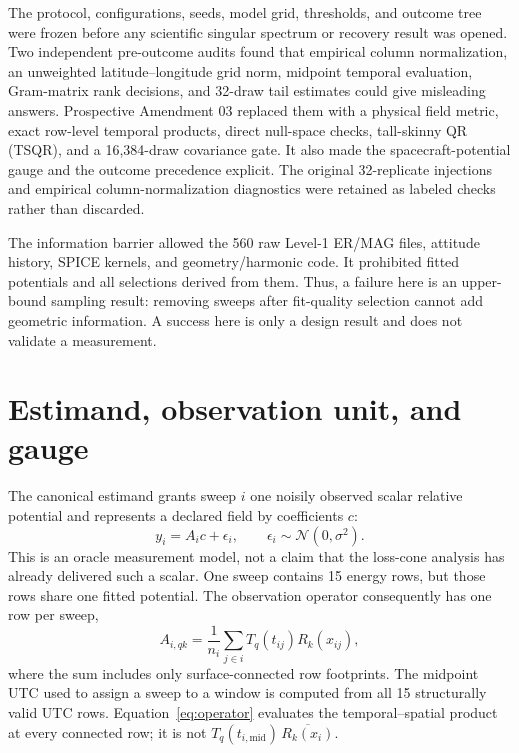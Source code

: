 \documentclass[11pt]{article}
\begin{document}
The protocol, configurations, seeds, model grid, thresholds, and outcome tree
were frozen before any scientific singular spectrum or recovery result was
opened.  Two independent pre-outcome audits found that empirical column
normalization, an unweighted latitude--longitude grid norm, midpoint temporal
evaluation, Gram-matrix rank decisions, and 32-draw tail estimates could give
misleading answers.  Prospective Amendment 03 replaced them with a physical
field metric, exact row-level temporal products, direct null-space checks,
tall-skinny QR (TSQR), and a 16,384-draw covariance gate.  It also made the
spacecraft-potential gauge and the outcome precedence explicit.  The original
32-replicate injections and empirical column-normalization diagnostics were
retained as labeled checks rather than discarded.

The information barrier allowed the 560 raw Level-1 ER/MAG files, attitude
history, SPICE kernels, and geometry/harmonic code.  It prohibited fitted
potentials and all selections derived from them.  Thus, a failure here is an
upper-bound sampling result: removing sweeps after fit-quality selection cannot
add geometric information.  A success here is only a design result and does
not validate a measurement.

\section{Estimand, observation unit, and gauge}

The canonical estimand grants sweep $i$ one noisily observed scalar relative
potential and represents a declared field by coefficients $c$:
\begin{equation}
  y_i = A_i c + \epsilon_i, \qquad
  \epsilon_i\sim\mathcal{N}(0,\sigma^2).
  \label{eq:model}
\end{equation}
This is an oracle measurement model, not a claim that the loss-cone analysis
has already delivered such a scalar.  One sweep contains 15 energy rows, but
those rows share one fitted potential.  The observation operator consequently
has one row per sweep,
\begin{equation}
 A_{i,qk}=\frac{1}{n_i}\sum_{j\in i}
 T_q(t_{ij})R_k(x_{ij}),
 \label{eq:operator}
\end{equation}
where the sum includes only surface-connected row footprints.  The midpoint
UTC used to assign a sweep to a window is computed from all 15 structurally
valid UTC rows.  Equation~\eqref{eq:operator} evaluates the temporal--spatial
product at every connected row; it is not
$T_q(t_{i,\mathrm{mid}})\,\overline{R_k(x_i)}$.
\end{document}
